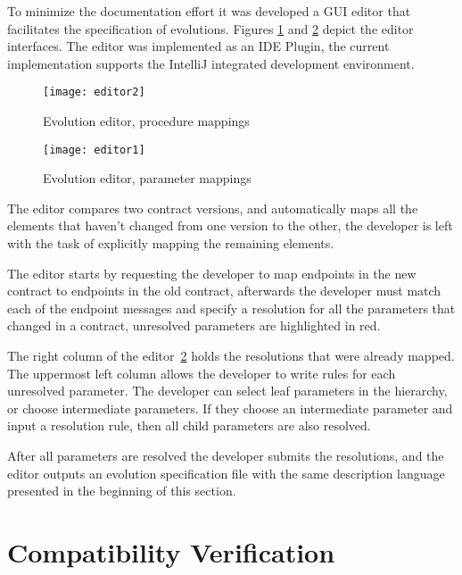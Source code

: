 To minimize the documentation effort it was developed a GUI editor that facilitates the specification of evolutions.
Figures \ref{fig:editor1} and \ref{fig:editor2} depict the editor interfaces.
The editor was implemented as an IDE Plugin, the current implementation supports the IntelliJ integrated development environment.

\begin{figure}[htbp]
    \centering
    \centerline{\texttt{[image: editor2]}}
    \caption{Evolution editor, procedure mappings}
    \label{fig:editor1}
\end{figure}

\begin{figure}[htbp]
    \centering
    \centerline{\texttt{[image: editor1]}}
    \caption{Evolution editor, parameter mappings}
    \label{fig:editor2}
\end{figure}

The editor compares two contract versions,
and automatically maps all the elements that haven't changed from one version to the other, the
developer is left with the task of explicitly mapping the remaining elements.

The editor starts by requesting the developer to map endpoints in the new contract to endpoints in the old contract,
afterwards the developer must match each of the endpoint messages and specify a resolution for all the parameters that changed
in a contract, unresolved parameters are highlighted in red.

The right column of the editor~\ref{fig:editor2} holds the resolutions that were already mapped.
The uppermost left column allows the developer to write rules for each unresolved parameter.
The developer can select leaf parameters in the hierarchy, or choose intermediate parameters.
If they choose an intermediate parameter and input a resolution rule, then all child parameters are also resolved.

After all parameters are resolved the developer submits the resolutions, and
the editor outputs an evolution specification file with the same description language presented in the beginning of this section.

\section{Compatibility Verification} %
\label{sec:compatibility_verification}

